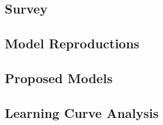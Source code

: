 
\subsection{Survey}


\subsection{Model Reproductions}


\subsection{Proposed Models}


\subsection{Learning Curve Analysis}



